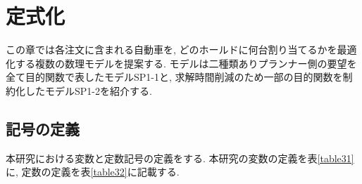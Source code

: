\chapter{定式化}\label{formulation}

この章では各注文に含まれる自動車を, どのホールドに何台割り当てるかを最適化する複数の数理モデルを提案する. モデルは二種類ありプランナー側の要望を全て目的関数で表したモデルSP1-1と, 求解時間削減のため一部の目的関数を制約化したモデルSP1-2を紹介する.

\section{記号の定義}
本研究における変数と定数記号の定義をする. 本研究の変数の定義を表\ref{table31}に, 定数の定義を表\ref{table32}に記載する. \\


